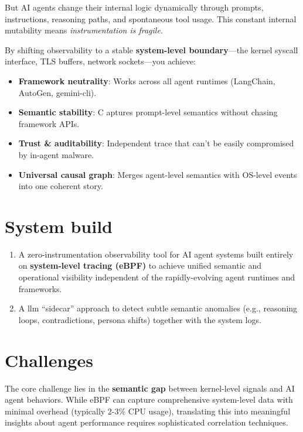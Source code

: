 \documentclass[sigplan,screen，review,9pt]{acmart}
\begin{document}
But AI agents change their internal logic dynamically through prompts, instructions, reasoning paths, and spontaneous tool usage. This constant internal mutability means \emph{instrumentation is fragile}.

By shifting observability to a stable \textbf{system-level boundary}—the kernel syscall interface, TLS buffers, network sockets—you achieve:

\begin{itemize}
  \item \textbf{Framework neutrality}: Works across all agent runtimes (LangChain, AutoGen, gemini-cli).
  \item \textbf{Semantic stability}: C aptures prompt-level semantics without chasing framework APIs.
  \item \textbf{Trust \& auditability}: Independent trace that can’t be easily compromised by in-agent malware.
  \item \textbf{Universal causal graph}: Merges agent-level semantics with OS-level events into one coherent story.
\end{itemize}


\section*{System build}

\begin{enumerate}
  \item A zero-instrumentation observability tool for AI agent systems built entirely on \textbf{system-level tracing (eBPF)} to achieve unified semantic and operational visibility independent of the rapidly-evolving agent runtimes and frameworks.
  \item A llm ``sidecar'' approach to detect subtle semantic anomalies (e.g., reasoning loops, contradictions, persona shifts) together with the system logs.
\end{enumerate}

\section*{Challenges}

The core challenge lies in the \textbf{semantic gap} between kernel-level signals and AI agent behaviors. While eBPF can capture comprehensive system-level data with minimal overhead (typically 2-3\% CPU usage), translating this into meaningful insights about agent performance requires sophisticated correlation techniques.
\end{document}
